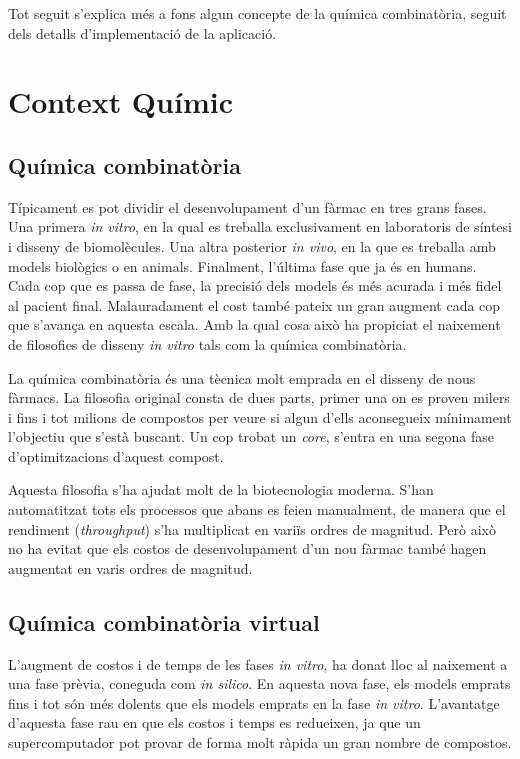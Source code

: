 \documentclass[titlepage,a4paper,12pt]{book}
\begin{document}
	Tot seguit s'explica més a fons algun concepte de la química combinatòria,
	seguit dels detalls d'implementació de la aplicació.


\section{Context Químic} %
	\label{sec:Context Quimic}

	\subsection{Química combinatòria}
	Típicament es pot dividir el desenvolupament d'un fàrmac en tres grans
	fases. Una primera \emph{in vitro}, en la qual es treballa exclusivament en
	laboratoris de síntesi i disseny de biomolècules. Una altra posterior
	\emph{in vivo}, en la que es treballa amb models biològics o en animals.
	Finalment, l'última fase que ja és en humans. Cada cop que es passa de fase,
	la precisió dels models és més acurada i més fidel al pacient final.
	Malauradament el cost també pateix un gran augment cada cop que s'avança en
	aquesta escala. Amb la qual cosa això ha propiciat el naixement de
	filosofies de disseny \emph{in vitro} tals com la química combinatòria.

	La química combinatòria és una tècnica molt emprada en el disseny de nous
	fàrmacs. La filosofia original consta de dues parts, primer una on es proven
	milers i fins i tot milions de compostos per veure si algun d'ells
	aconsegueix mínimament l'objectiu que s'està buscant. Un cop trobat un
	\emph{core}, s'entra en una segona fase d'optimitzacions d'aquest compost.

	Aquesta filosofia s'ha ajudat molt de la biotecnologia moderna. S'han
	automatitzat tots els processos que abans es feien manualment, de manera que
	el rendiment (\emph{throughput}) s'ha multiplicat en variïs ordres de
	magnitud. Però això no ha evitat que els costos de desenvolupament d'un nou
	fàrmac també hagen augmentat en varis ordres de magnitud.

	\subsection{Química combinatòria virtual}

	L'augment de costos i de temps de les fases \emph{in vitro}, ha donat lloc
	al naixement a una fase prèvia, coneguda com \emph{in silico}. En aquesta
	nova fase, els models emprats fins i tot són més dolents que els models
	emprats en la fase \emph{in vitro}.  L'avantatge d'aquesta fase rau en que
	els costos i temps es redueixen, ja que un supercomputador pot provar de
	forma molt ràpida un gran nombre de compostos.
\end{document}
